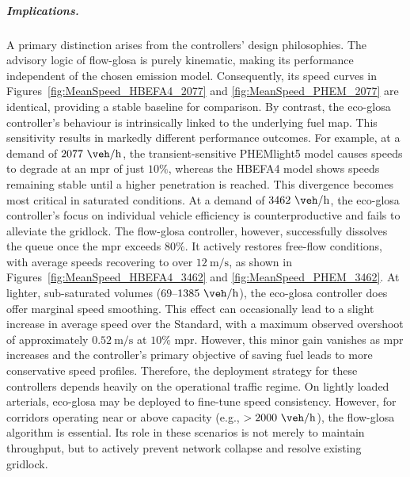 \subparagraph*{Implications.}
A primary distinction arises from the controllers' design philosophies. The advisory logic of \ac{flow-glosa} is purely kinematic, making its performance independent of the chosen emission model. Consequently, its speed curves in Figures~\vref{fig:MeanSpeed_HBEFA4_2077} and \vref{fig:MeanSpeed_PHEM_2077} are identical, providing a stable baseline for comparison. By contrast, the \ac{eco-glosa} controller's behaviour is intrinsically linked to the underlying fuel map. This sensitivity results in markedly different performance outcomes. For example, at a demand of $2077~\unit{\veh\per\hour}$, the transient-sensitive PHEMlight5 model causes speeds to degrade at an \ac{mpr} of just $10\%$, whereas the HBEFA4 model shows speeds remaining stable until a higher penetration is reached.
This divergence becomes most critical in saturated conditions. At a demand of $3462~\unit{\veh\per\hour}$, the \ac{eco-glosa} controller's focus on individual vehicle efficiency is counterproductive and fails to alleviate the gridlock. The \ac{flow-glosa} controller, however, successfully dissolves the queue once the \ac{mpr} exceeds $80\%$. It actively restores free-flow conditions, with average speeds recovering to over $12~\unit{\metre\per\second}$, as shown in Figures~\vref{fig:MeanSpeed_HBEFA4_3462} and \vref{fig:MeanSpeed_PHEM_3462}.
At lighter, sub-saturated volumes ($69$--$1385~\unit{\veh\per\hour}$), the \ac{eco-glosa} controller does offer marginal speed smoothing. This effect can occasionally lead to a slight increase in average speed over the Standard, with a maximum observed overshoot of approximately $0.52~\unit{\metre\per\second}$ at $10\%$ \ac{mpr}. However, this minor gain vanishes as \ac{mpr} increases and the controller's primary objective of saving fuel leads to more conservative speed profiles. Therefore, the deployment strategy for these controllers depends heavily on the operational traffic regime. On lightly loaded arterials, \ac{eco-glosa} may be deployed to fine-tune speed consistency. However, for corridors operating near or above capacity (e.g., $> 2000~\unit{\veh\per\hour}$), the \ac{flow-glosa} algorithm is essential. Its role in these scenarios is not merely to maintain throughput, but to actively prevent network collapse and resolve existing gridlock.

